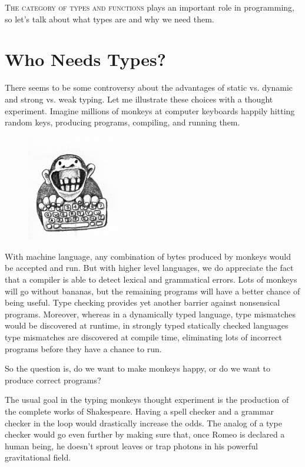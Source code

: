 \lettrine[lhang=0.17]{T}{he category of types and functions} plays an important role in
programming, so let's talk about what types are and why we need them.

\section{Who Needs Types?}

There seems to be some controversy about the advantages of static vs.
dynamic and strong vs. weak typing. Let me illustrate these choices with
a thought experiment. Imagine millions of monkeys at computer keyboards
happily hitting random keys, producing programs, compiling, and running
them.

\begin{figure}
\centering
\includegraphics[width=40mm]{images/img_1329.jpg}
\end{figure}

With machine language, any combination of bytes produced by monkeys
would be accepted and run. But with higher level languages, we do
appreciate the fact that a compiler is able to detect lexical and
grammatical errors. Lots of monkeys will go without bananas, but the
remaining programs will have a better chance of being useful. Type
checking provides yet another barrier against nonsensical programs.
Moreover, whereas in a dynamically typed language, type mismatches would
be discovered at runtime, in strongly typed statically checked languages
type mismatches are discovered at compile time, eliminating lots of
incorrect programs before they have a chance to run.

So the question is, do we want to make monkeys happy, or do we want to
produce correct programs?

The usual goal in the typing monkeys thought experiment is the
production of the complete works of Shakespeare. Having a spell checker
and a grammar checker in the loop would drastically increase the odds.
The analog of a type checker would go even further by making sure that,
once Romeo is declared a human being, he doesn't sprout leaves or trap
photons in his powerful gravitational field.

